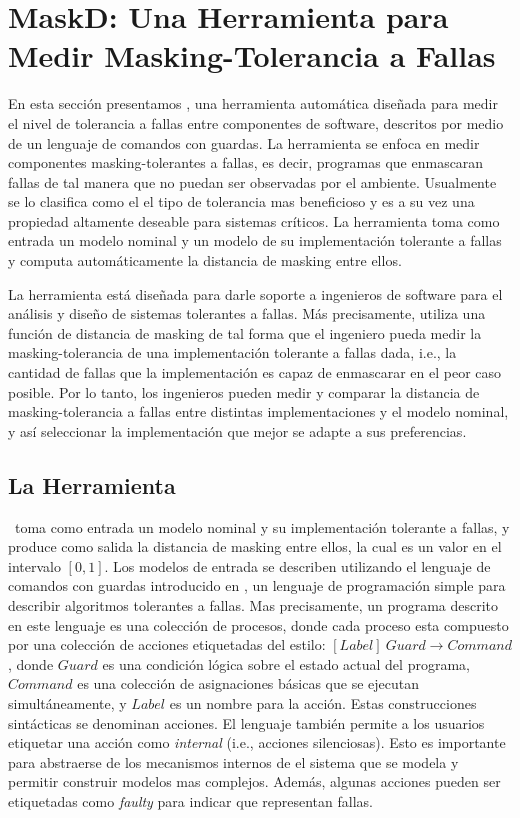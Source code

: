 \section{MaskD: Una Herramienta para Medir Masking-Tolerancia a Fallas}
\label{sec:maskD}

En esta sección presentamos {\MaskD}, una herramienta automática diseñada para medir el nivel de tolerancia a fallas entre componentes de software, 
descritos por medio de un lenguaje de comandos con guardas.
La herramienta se enfoca en medir componentes masking-tolerantes a fallas, es decir, programas que enmascaran fallas de tal manera que no puedan ser observadas por el ambiente. Usualmente se lo clasifica como el el tipo de tolerancia mas beneficioso y es a su vez una propiedad altamente deseable para sistemas críticos. 
La herramienta toma como entrada un modelo nominal y un modelo de su implementación tolerante a fallas y computa automáticamente la distancia de masking entre ellos. 

La herramienta está diseñada para darle soporte a ingenieros de software para el análisis y diseño de sistemas tolerantes a fallas. Más precisamente, utiliza una función de distancia de masking de tal forma que el ingeniero pueda medir la masking-tolerancia de una implementación tolerante a fallas dada, i.e., la cantidad de fallas que la implementación es capaz de enmascarar en el peor caso posible. 
Por lo tanto, los ingenieros pueden medir y comparar la distancia de masking-tolerancia a fallas entre distintas implementaciones y el modelo nominal, y así seleccionar la implementación que mejor se adapte a sus preferencias.

\subsection{La Herramienta} \label{sec:mask_sec}

\MaskD~toma como entrada un modelo nominal y su implementación tolerante a fallas, y produce como salida la distancia de masking entre ellos, la cual es un valor en el intervalo $[0,1]$.
Los modelos de entrada se describen utilizando el lenguaje de comandos con guardas introducido en \cite{AroraGouda93}, un lenguaje de programación simple para describir algoritmos tolerantes a fallas.
Mas precisamente, un programa descrito en este lenguaje es una colección de procesos, donde cada proceso esta compuesto por una colección de acciones etiquetadas del estilo: $[Label]~Guard \rightarrow Command$, donde $Guard$ es una condición lógica sobre el estado actual del programa, $Command$ es una colección de asignaciones básicas que se ejecutan simultáneamente, y $Label$ es un nombre para la acción.
Estas construcciones sintácticas se denominan acciones. El lenguaje también permite a los usuarios etiquetar una acción como \emph{internal} (i.e., acciones silenciosas). Esto es importante para abstraerse de los mecanismos internos de el sistema que se modela y permitir construir modelos mas complejos. Además, algunas acciones pueden ser etiquetadas como \emph{faulty} para indicar que representan fallas. 

